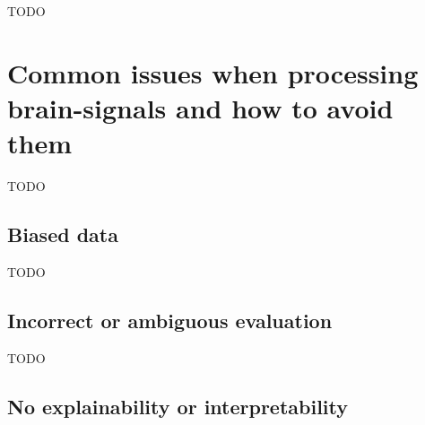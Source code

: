 


TODO



\section{Common issues when processing brain-signals and how to avoid them}
\label{sec:processing_signals_common_issues}
TODO


\subsection{Biased data}
\label{subsec:processing_signals_common_issues_bias}

TODO


\subsection{Incorrect or ambiguous evaluation}
\label{subsec:processing_signals_common_issues_generalisation}

TODO


\subsection{No explainability or interpretability}
\label{subsec:processing_signals_common_issues_exaplainable}

